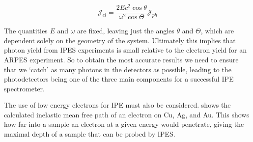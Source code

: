 \begin{equation}
\mathscr{J}_{el} = \frac{2Ec^2\cos\theta}{\omega^2\cos\Theta}\mathscr{J}_{ph}
\label{eq:pendry}
\end{equation}

The quantities $E$ and $\omega$ are fixed, leaving just the angles $\theta$ and $\Theta$, which are dependent solely on the geometry of the system. Ultimately this implies that photon yield from IPES experiments is small 
relative to the electron yield for an ARPES experiment. So to obtain the most accurate results we need to ensure that we `catch' as many photons in the detectors as possible, leading
to the photodetectors being one of the three main components for a successful IPE spectrometer. 

The use of low energy electrons for IPE must also be considered.  shows the calculated inelastic mean free path of an electron on Cu, Ag, and Au. This shows how far into
a sample an electron at a given energy would penetrate, giving the maximal depth of a sample that can be probed by IPES. 
\clearpage

